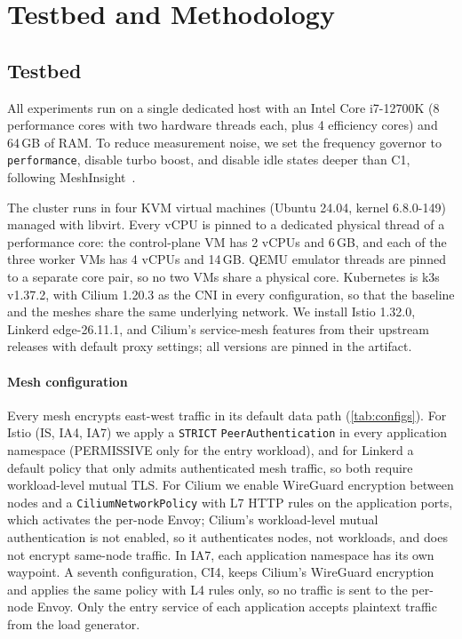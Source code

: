 \section{Testbed and Methodology}
\label{sec:method}

\subsection{Testbed}
\label{sec:testbed}

All experiments run on a single dedicated host with an Intel Core i7-12700K
(8 performance cores with two hardware threads each, plus 4 efficiency cores)
and 64\,GB of RAM. To reduce measurement noise, we set the frequency governor
to \texttt{performance}, disable turbo boost, and disable idle states deeper
than C1, following MeshInsight~\cite{zhu2023meshinsight}.

The cluster runs in four KVM virtual machines (Ubuntu 24.04, kernel
6.8.0-149) managed with libvirt. Every vCPU is pinned to a dedicated
physical thread of a performance core: the control-plane VM has 2 vCPUs and
6\,GB, and each of the three worker VMs has 4 vCPUs and 14\,GB. QEMU emulator
threads are pinned to a separate core pair, so no two VMs share a physical
core. Kubernetes is k3s v1.37.2, with Cilium 1.20.3 as the CNI in
every configuration, so that the baseline and the meshes share the same
underlying network. We install Istio 1.32.0, Linkerd
edge-26.11.1, and Cilium's service-mesh features from their upstream
releases with default proxy settings; all versions are pinned in the
artifact.

\paragraph{Mesh configuration}
Every mesh encrypts east-west traffic in its default data path
(\cref{tab:configs}). For Istio (IS, IA4, IA7) we apply a \texttt{STRICT}
\texttt{PeerAuthentication} in every application namespace (PERMISSIVE only
for the entry workload), and for Linkerd a default policy
that only admits authenticated mesh traffic, so both require workload-level
mutual TLS. For Cilium we enable WireGuard encryption between nodes and a
\texttt{CiliumNetworkPolicy} with L7 HTTP rules on the application ports,
which activates the per-node Envoy; Cilium's workload-level mutual
authentication is not enabled, so it authenticates nodes, not workloads, and
does not encrypt same-node traffic. In IA7, each application namespace has its
own waypoint. A seventh configuration, CI4, keeps Cilium's WireGuard
encryption and applies the same policy with L4 rules only, so no traffic is
sent to the per-node Envoy. Only the entry service of each application
accepts plaintext traffic from the load generator.

